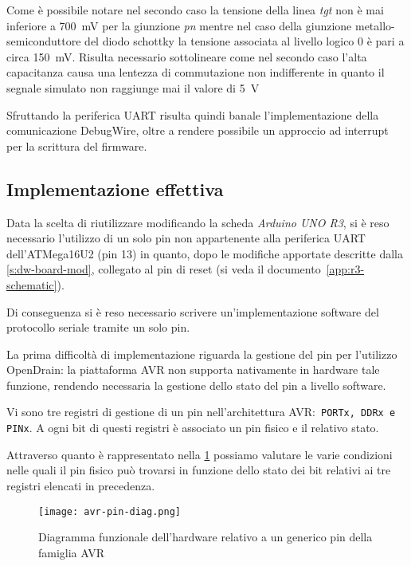Come è possibile notare nel secondo caso la tensione della linea \textit{tgt} non è mai inferiore a \SI{700}{\milli\volt} per la giunzione \textit{pn} mentre nel caso della giunzione metallo-semiconduttore del diodo schottky la tensione associata al livello logico 0 è pari a circa \SI{150}{\milli\volt}. Risulta necessario sottolineare come nel secondo caso l'alta capacitanza causa una lentezza di commutazione non indifferente in quanto il segnale simulato non raggiunge mai il valore di \SI{5}{\volt}

Sfruttando la periferica UART risulta quindi banale l'implementazione della comunicazione DebugWire, oltre a rendere possibile un approccio ad interrupt per la scrittura del firmware.

\subsection{Implementazione effettiva}

Data la scelta di riutilizzare modificando la scheda \textit{Arduino UNO R3}, si è reso necessario l'utilizzo di un solo pin non appartenente alla periferica UART dell'ATMega16U2\cite{avr:m16u2} (pin 13) in quanto, dopo le modifiche apportate descritte dalla \cref{s:dw-board-mod}, collegato al pin di reset (si veda il documento~\ref{app:r3-schematic}).

Di conseguenza si è reso necessario scrivere un'implementazione software del protocollo seriale tramite un solo pin.

La prima difficoltà di implementazione riguarda la gestione del pin per l'utilizzo OpenDrain: la piattaforma AVR non supporta nativamente in hardware tale funzione, rendendo necessaria la gestione dello stato del pin a livello software.

Vi sono tre registri di gestione di un pin nell'architettura AVR:\ \texttt{PORTx, DDRx e PINx}. A ogni bit di questi registri è associato un pin fisico e il relativo stato.

Attraverso quanto è rappresentato nella \cref{fig:avr-pin} possiamo valutare le varie condizioni nelle quali il pin fisico può trovarsi in funzione dello stato dei bit relativi ai tre registri elencati in precedenza.

\begin{figure}[t]
    \centering
    \texttt{[image: avr-pin-diag.png]}
    \caption[Immagine ottenuta dal documento\cite{avr:m16u2}, fig. 12-2]{Diagramma funzionale dell'hardware relativo a un generico pin della famiglia AVR\cite[fig. 12-2]{avr:m16u2}}\label{fig:avr-pin}
\end{figure}


